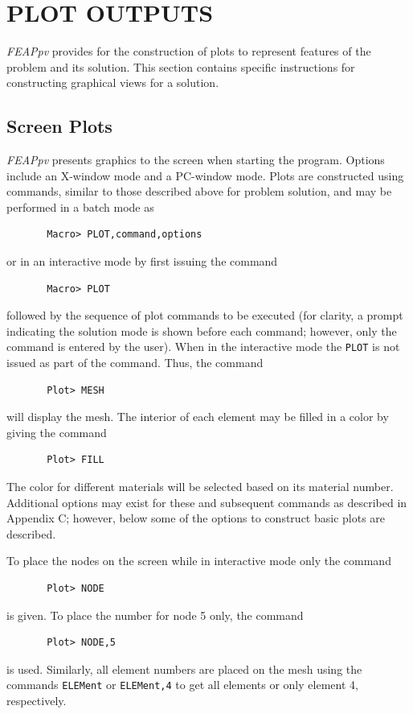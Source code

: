 \chapter[Plot Outputs]{PLOT OUTPUTS}
\label{plot}

{\sl FEAPpv} provides for the construction of plots to represent features of
the problem and its solution.
This section contains specific instructions for constructing graphical
views for a solution.

\section{Screen Plots}
\label{screen}

{\sl FEAPpv} presents graphics to the screen when starting the program.
Options include an X-window mode and a PC-window mode.
Plots are constructed using commands,
similar to those described above for problem solution, and
may be performed in a batch mode as
\begin{verbatim}
       Macro> PLOT,command,options
\end{verbatim}
or in an interactive mode by first issuing the command
\begin{verbatim}
       Macro> PLOT
\end{verbatim}
followed by the sequence of plot commands to be executed
(for clarity, a prompt indicating the solution mode is shown before each
command; however, only the command is entered by the user).  When in the
interactive mode the {\tt PLOT} is not issued as part of the command.
Thus, the command
\begin{verbatim}
       Plot> MESH
\end{verbatim}
will display the mesh. The interior of each element may be filled in a color
by giving the command
\begin{verbatim}
       Plot> FILL
\end{verbatim}
The color for different materials will be selected based on its material number.
Additional options may exist for these and subsequent commands as described in
Appendix C; however, below some of the options to construct basic plots are
described.

To place the nodes on the screen while in interactive mode only the command
\begin{verbatim}
       Plot> NODE
\end{verbatim}
is given.  To place the number for node 5 only, the command
\begin{verbatim}
       Plot> NODE,5
\end{verbatim}
is used.  Similarly, all element numbers are placed on the mesh using the
commands {\tt ELEMent} or {\tt ELEMent,4}
to get all elements or only element 4, respectively.

